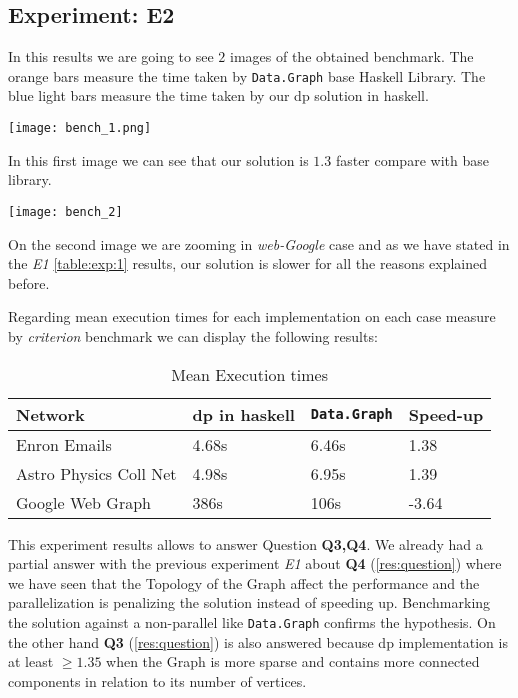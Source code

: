 \documentclass[preprint]{elsarticle}
\begin{document}
\subsection{\textbf{Experiment: E2}}

In this results we are going to see $2$ images of the obtained benchmark. The orange bars measure the time taken by \texttt{Data.Graph} base Haskell Library. The blue light bars measure the time taken by our \acrshort{dp} solution in \acrshort{haskell}.

\begin{minipage}[t]{\linewidth}
  \texttt{[image: bench\_1.png]}
  \captionsetup{type=figure}
  \label{fig:1}
\end{minipage}

In this first image we can see that our solution is $1.3$ faster compare with base library.

\begin{minipage}[t]{\linewidth}
  \texttt{[image: bench\_2]}
  \captionsetup{type=figure}
  \label{fig:2}
\end{minipage}

On the second image we are zooming in \emph{web-Google} case and as we have stated in the \emph{E1} \autoref{table:exp:1} results, our solution is slower for all the reasons explained before.

Regarding mean execution times for each implementation on each case measure by \emph{criterion} benchmark we can display the following results:

\begin{table}[H]
  \centering
  \begin{tabular}{|l|l|l|l|}
   \hline
   \textbf{Network} & \textbf{\acrshort{dp} in \acrshort{haskell}} & \textbf{\texttt{Data.Graph}} & \textbf{Speed-up}\\
   \hline
   Enron Emails & 4.68s &  6.46s & 1.38\\
   \hline
   Astro Physics Coll Net & 4.98s & 6.95s  & 1.39\\
   \hline
   Google Web Graph & 386s & 106s & -3.64\\
   \hline
  \end{tabular}
 \caption{Mean Execution times}
 \label{table:6}
 \end{table}

This experiment results allows to answer Question \textbf{Q3,Q4}.
We already had a partial answer with the previous experiment \emph{E1} about \textbf{Q4} (\autoref{res:question}) where we have seen that the Topology of the Graph affect the performance and the parallelization is penalizing the solution instead of speeding up. Benchmarking the solution against a non-parallel like \texttt{Data.Graph} confirms the hypothesis. On the other hand \textbf{Q3} (\autoref{res:question}) is also answered because \acrshort{dp} implementation is at least $\geq 1.35$ when the Graph is more sparse and contains more connected components in relation to its number of vertices.
\end{document}
